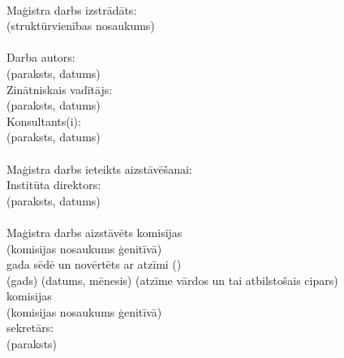 \phantom{ }\\
Maģistra darbs izstrādāts: \hrulefill\\
\hspace*{8cm}
\footnotesize (struktūrvienības nosaukums)\\
\normalsize
\vfill
%
\phantom{ }\\
Darba autors: \hrulefill\\
\hspace*{8cm}
\footnotesize (paraksts, datums)\\
\normalsize
%
Zinātniskais vadītājs: \hrulefill\\
\hspace*{8cm}
\footnotesize (paraksts, datums)\\
\normalsize
%
Konsultants(i): \hrulefill\\
\hspace*{8cm}
\footnotesize  (paraksts, datums)\\
\normalsize
\vfill
%
\phantom{ }\\
Maģistra darbs ieteikts aizstāvēšanai:\\
Institūta direktors: \hrulefill\\
\hspace*{8cm}
\footnotesize (paraksts, datums)\\
\normalsize
%
\vfill 
\phantom{ }\\
Maģistra darbs aizstāvēts \hrulefill komisijas\\
\hspace*{8cm}
\footnotesize (komisijas nosaukums ģenitīvā)\\
\normalsize
%
\makebox[2cm]{\hrulefill} gada \hrulefill sēdē un novērtēts ar atzīmi \makebox[3cm]{\hrulefill}(\makebox[1cm]{\hrulefill})\\
\footnotesize
\hspace*{5mm}
 (gads)
	\hspace*{8mm}\phantom{ gada } 	
 	 (datums, mēnesis) 
 	 			\hspace*{8mm}\phantom{sēdē un novērtēts ar atzīmi} 
 	 	(atzīme vārdos un tai atbilstošais cipars)\\
\normalsize
%
\makebox[14.1cm]{\hrulefill} komisijas\\
\footnotesize
\hspace*{6cm}(komisijas nosaukums ģenitīvā)\\
\normalsize
%
\hspace*{50mm}
sekretārs: \makebox[5cm]{\hrulefill}\\
\footnotesize
\hspace*{8cm}
\footnotesize (paraksts)
\normalsize
%
